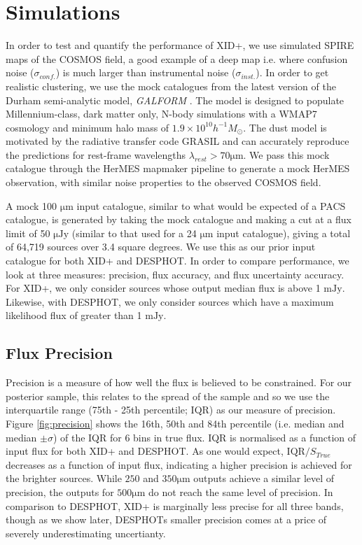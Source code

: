 \documentclass[useAMS,usenatbib]{mnras}
\begin{document}
\section{Simulations}\label{sec:sims}
In order to test and quantify the performance of XID+, we use simulated SPIRE maps of the COSMOS field, a good example of a deep map i.e. where confusion noise ($\sigma_{conf.}$) is much larger than instrumental noise ($\sigma_{inst.}$). In order to get realistic clustering, we use the mock catalogues from the latest version of the Durham semi-analytic model, \emph{GALFORM} \citep{Lacey:2015,Cowley:2014}. The model is designed to populate Millennium-class, dark matter only, N-body simulations with a WMAP7 cosmology and minimum halo mass of $1.9 \times 10^{10} h^{-1} M_{\odot}$. The dust model is motivated by the radiative transfer code GRASIL \citep{Silva:1998} and can accurately reproduce the predictions for rest-frame wavelengths $\lambda_{rest} > 70 \mathrm{\mu m}$. We pass this mock catalogue through the HerMES mapmaker pipeline \citep[e.g.][]{Levenson:2010,Viero:2013} to generate a mock HerMES observation, with similar noise properties to the observed COSMOS field.

A mock 100 $\mathrm{\mu m}$ input catalogue, similar to what would be expected of a PACS catalogue, is generated by taking the mock catalogue and making a cut at a flux limit of 50 $\mathrm{\mu Jy}$ (similar to that used for a 24 $\mathrm{\mu m}$ input catalogue), giving a total of 64,719 sources over 3.4 square degrees. We use this as our prior input catalogue for both \textsc{XID+} and \textsc{DESPHOT}. In order to compare performance, we look at three measures: precision, flux accuracy, and flux uncertainty accuracy. For \textsc{XID+}, we only consider sources whose output median flux is above 1 $\mathrm{mJy}$. Likewise, with \textsc{DESPHOT}, we only consider sources which have a maximum likelihood flux of greater than 1 $\mathrm{mJy}$. 

\subsection{Flux Precision}
\label{sec:prec}
Precision is a measure of how well the flux is believed to be constrained. For our posterior sample, this relates to the spread of the sample and so we use the interquartile range (75th - 25th percentile; IQR) as our measure of precision. Figure \ref{fig:precision} shows the 16th, 50th and 84th percentile (i.e. median and median $\pm \sigma$) of the IQR for 6 bins in true flux. IQR is normalised as a function of input flux for both \textsc{XID+} and \textsc{DESPHOT}. As one would expect, $\mathrm{IQR}/S_{True}$ decreases as a function of input flux, indicating a higher precision is achieved for the brighter sources. While $250$ and $350\mathrm{\mu m}$ outputs achieve a similar level of precision, the outputs for $500 \mathrm{\mu m}$ do not reach the same level of precision. In comparison to \textsc{DESPHOT}, \textsc{XID+} is marginally less precise for all three bands, though as we show later, \textsc{DESPHOT}s smaller precision comes at a price of severely underestimating uncertianty. 
\end{document}
